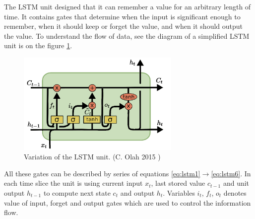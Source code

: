 The LSTM unit designed that it can remember a value for an arbitrary length of time. It contains gates that determine when the input is significant enough to remember, when it should keep or forget the value, and when it should output the value. To understand the flow of data, see the diagram of a simplified LSTM unit is on the figure \ref{fig:lstm}.

\begin{figure}[!ht]
	\centering
	\includegraphics[width=0.7\textwidth]{./fig/LSTM3-var-peepholes.png}
	\caption{Variation of the LSTM unit. (C. Olah 2015 \cite{colah-lstm})
		\label{fig:lstm}}
\end{figure}

All these gates can be described by series of equations \eqref{eq:lstm1}$ \rightarrow $\eqref{eq:lstm6}. In each time slice the unit is using current input $ x_t $, last stored value $ c_{t-1} $ and unit output $ h_{t-1} $ to compute next state $ c_t $ and output $ h_t $. Variables $ i_t $, $ f_t $, $ o_t $ denotes value of input, forget and output gates which are used to control the information flow.

